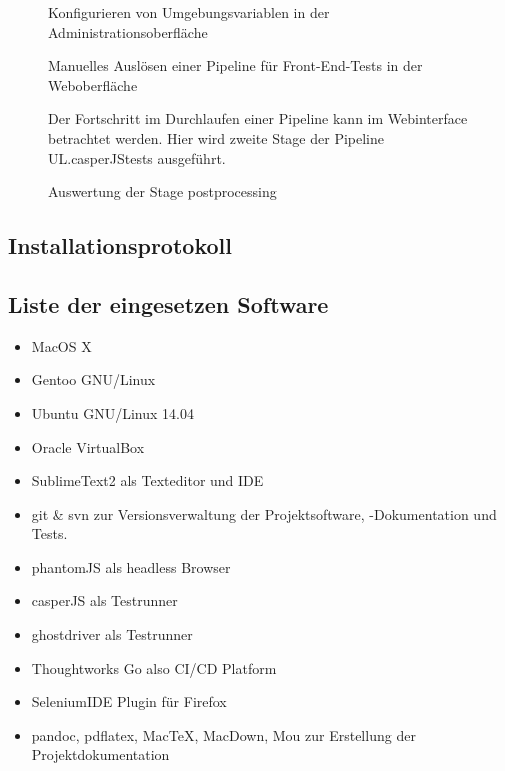 \begin{figure}[htb]
\centering
{}
\caption{Konfigurieren von Umgebungsvariablen in der Administrationsoberfläche}
\label{fig:goguienvvars}
\end{figure}


 \begin{figure}[htb]
\centering
{}
\caption{Manuelles Auslösen einer Pipeline für Front-End-Tests in der Weboberfläche}
\label{fig:goguitrigger}
\end{figure}



\begin{figure}[htb]
\centering
{}
\caption{Der Fortschritt im Durchlaufen einer Pipeline kann im Webinterface betrachtet werden.  Hier wird zweite Stage der Pipeline UL.casperJStests ausgeführt.}
\label{fig:goguistagedetail}
\end{figure}

\begin{figure}[htb]
\centering

\caption{Auswertung der Stage postprocessing }
\label{fig:goguisummary}
\end{figure}

\clearpage
  \subsection{Installationsprotokoll}\label{installprotocoll}
  
  \clearpage

\subsection{Liste der eingesetzen
Software}\label{liste-der-eingesetzen-software}

\begin{itemize}
\itemsep1pt\parskip0pt
\item
  MacOS X
\item
  Gentoo GNU/Linux
\item
  Ubuntu GNU/Linux 14.04
\item
  Oracle VirtualBox
\item
  SublimeText2 als Texteditor und \acs{IDE}
\item
  git \& svn zur Versionsverwaltung der Projektsoftware, -Dokumentation
  und Tests.
\item
  phantomJS als headless Browser
\item
  casperJS als Testrunner
\item
  ghostdriver als Testrunner
\item
  Thoughtworks Go also CI/CD Platform
\item
  SeleniumIDE Plugin für Firefox
\item
  pandoc, pdflatex, MacTeX, MacDown, Mou zur Erstellung der
  Projektdokumentation
\end{itemize}

